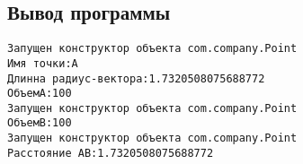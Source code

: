 \documentclass[12pt,a4paper,oneside,titlepage]{article}
\begin{document}
\subsection{Вывод программы}
\begin{verbatim}
Запущен конструктор объекта com.company.Point
Имя точки:A
Длинна радиус-вектора:1.7320508075688772
ОбъемА:100
Запущен конструктор объекта com.company.Point
ОбъемB:100
Запущен конструктор объекта com.company.Point
Расстояние AB:1.7320508075688772
\end{verbatim}
\end{document}
